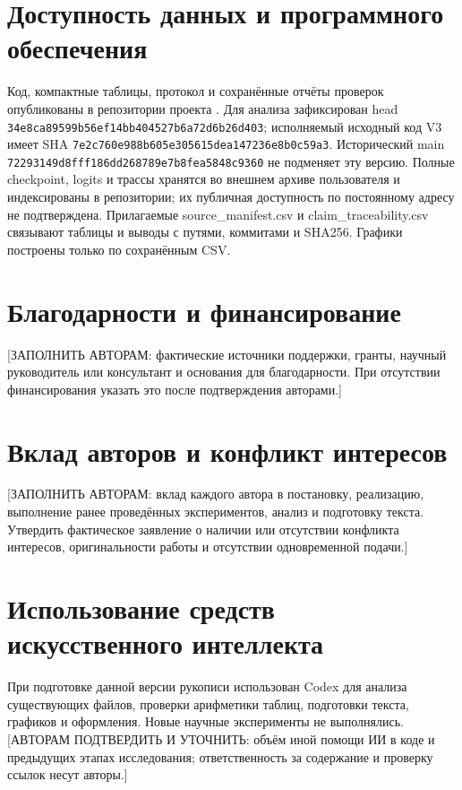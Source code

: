 \documentclass[10pt,a4paper]{article}
\begin{document}
\section*{Доступность данных и программного обеспечения}
Код, компактные таблицы, протокол и сохранённые отчёты проверок опубликованы в репозитории проекта \cite{r16}. Для анализа зафиксирован head \texttt{34e8ca89\allowbreak 599b56ef\allowbreak 14bb4045\allowbreak 27b6a72d\allowbreak 6b26d403}; исполняемый исходный код V3 имеет SHA \texttt{7e2c760e\allowbreak 988b605e\allowbreak 305615de\allowbreak a147236e\allowbreak 8b0c59a3}. Исторический main \texttt{72293149\allowbreak d8fff186\allowbreak dd268789\allowbreak e7b8fea5\allowbreak 848c9360} не подменяет эту версию. Полные checkpoint, logits и трассы хранятся во внешнем архиве пользователя и индексированы в репозитории; их публичная доступность по постоянному адресу не подтверждена. Прилагаемые source\_manifest.csv и claim\_traceability.csv связывают таблицы и выводы с путями, коммитами и SHA256. Графики построены только по сохранённым CSV.

\section*{Благодарности и финансирование}
[ЗАПОЛНИТЬ АВТОРАМ: фактические источники поддержки, гранты, научный руководитель или консультант и основания для благодарности. При отсутствии финансирования указать это после подтверждения авторами.]

\section*{Вклад авторов и конфликт интересов}
[ЗАПОЛНИТЬ АВТОРАМ: вклад каждого автора в постановку, реализацию, выполнение ранее проведённых экспериментов, анализ и подготовку текста. Утвердить фактическое заявление о наличии или отсутствии конфликта интересов, оригинальности работы и отсутствии одновременной подачи.]

\section*{Использование средств искусственного интеллекта}
При подготовке данной версии рукописи использован Codex для анализа существующих файлов, проверки арифметики таблиц, подготовки текста, графиков и оформления. Новые научные эксперименты не выполнялись. [АВТОРАМ ПОДТВЕРДИТЬ И УТОЧНИТЬ: объём иной помощи ИИ в коде и предыдущих этапах исследования; ответственность за содержание и проверку ссылок несут авторы.]
\end{document}
